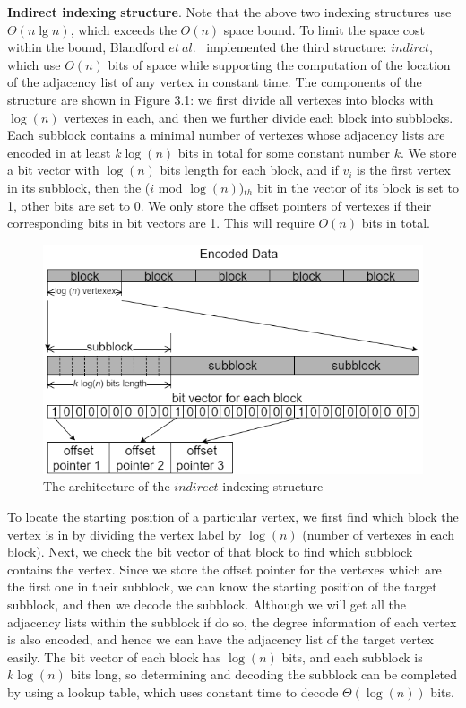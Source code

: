 \documentclass[12pt,glossary]{dalthesis}
\begin{document}
\textbf{Indirect indexing structure}. Note that the above two indexing structures use $ \Theta (n\lg n)$, which exceeds the $O(n)$ space bound. To limit the space cost within the bound, Blandford $et \ al.$~\cite{compact-representation} implemented the third structure: $indirct$, which use $O(n)$ bits of space while supporting the computation of the location of the adjacency list of any vertex in constant time. The components of the structure are shown in  Figure 3.1: we first divide all vertexes into blocks with $\log(n)$ vertexes in each, and then we further divide each block into subblocks. Each subblock contains a minimal number of vertexes whose adjacency lists are encoded in at least $k\log(n)$ bits in total for some constant number $k$. We store a bit vector with $\log(n)$ bits length for each block, and if $v_{i}$ is the first vertex in its subblock, then the ($i$ mod $\log (n)$)$_{th}$ bit in the vector of its block is set to 1, other bits are set to 0. We only store the offset pointers of vertexes if their corresponding bits in bit vectors are 1. This will require $O(n)$ bits in total. 

\bigskip

\begin{figure}[ht]
\centering
\includegraphics[width=1.0\textwidth]{indirect}
\caption{The architecture of the $indirect$ indexing structure}
\end{figure}

\bigskip

To locate the starting position of a particular vertex, we first find which block the vertex is in by dividing the vertex label by $\log(n)$ (number of vertexes in each block). Next, we check the bit vector of that block to find which subblock contains the vertex. Since we store the offset pointer for the vertexes which are the first one in their subblock, we can know the starting position of the target subblock, and then we decode the subblock. Although we will get all the adjacency lists within the subblock if do so, the degree information of each vertex is also encoded, and hence we can have the adjacency list of the target vertex easily. The bit vector of each block has $\log(n)$ bits, and each subblock is $k\log(n)$ bits long, so determining and decoding the subblock can be completed by using a lookup table, which uses constant time to decode $\Theta(\log(n))$ bits.              
\end{document}

